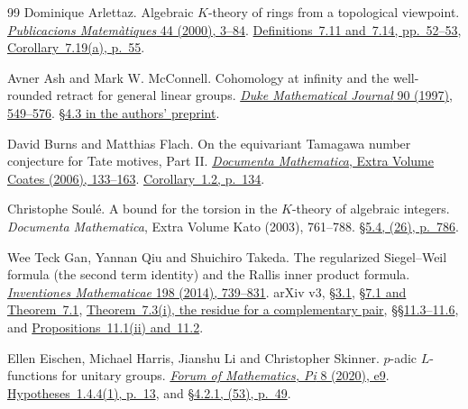 \begin{thebibliography}{99}
Dominique Arlettaz.
Algebraic \(K\)-theory of rings from a topological viewpoint.
\href{https://mat.uab.es/pubmat/fitxers/download/FileType:pdf/FolderName:v44(1)/FileName:44100_01.pdf}
{\emph{Publicacions Matemàtiques} 44 (2000), 3--84}.
\href{https://mat.uab.es/pubmat/fitxers/download/FileType:pdf/FolderName:v44(1)/FileName:44100_01.pdf\#page=50}
{Definitions~7.11 and~7.14, pp.~52--53},
\href{https://mat.uab.es/pubmat/fitxers/download/FileType:pdf/FolderName:v44(1)/FileName:44100_01.pdf\#page=53}
{Corollary~7.19(a), p.~55}.

Avner Ash and Mark W. McConnell.
Cohomology at infinity and the well-rounded retract for general
linear groups.
\href{https://doi.org/10.1215/S0012-7094-97-09015-3}
{\emph{Duke Mathematical Journal} 90 (1997), 549--576}.
\href{https://arxiv.org/pdf/math/9611220v1\#page=12}
{\S4.3 in the authors' preprint}.

David Burns and Matthias Flach.
On the equivariant Tamagawa number conjecture for Tate motives, Part II.
\href{https://doi.org/10.4171/DMS/4/4}
{\emph{Documenta Mathematica}, Extra Volume Coates (2006), 133--163}.
\href{https://ems.press/content/book-chapter-files/27466?nt=1\#page=2}
{Corollary~1.2, p.~134}.

Christophe Soul\'e.
A bound for the torsion in the \(K\)-theory of algebraic integers.
\emph{Documenta Mathematica}, Extra Volume Kato (2003), 761--788.
\href{https://ems.press/content/book-chapter-files/27335\#page=26}
{\S5.4, (26), p.~786}.

Wee Teck Gan, Yannan Qiu and Shuichiro Takeda.
The regularized Siegel--Weil formula (the second term identity) and the
Rallis inner product formula.
\href{https://doi.org/10.1007/s00222-014-0509-0}{\emph{Inventiones
Mathematicae} 198 (2014), 739--831}.
arXiv v3, \href{https://arxiv.org/pdf/1207.4709v3\#page=14}{\S3.1},
\href{https://arxiv.org/pdf/1207.4709v3\#page=33}{\S7.1 and Theorem~7.1},
\href{https://arxiv.org/pdf/1207.4709\#page=34}{Theorem~7.3(i), the residue for a complementary pair},
\href{https://arxiv.org/pdf/1207.4709v3\#page=52}{\S\S11.3--11.6}, and
\href{https://arxiv.org/pdf/1207.4709v3\#page=53}{Propositions~11.1(ii) and~11.2}.

Ellen Eischen, Michael Harris, Jianshu Li and Christopher Skinner.
\(p\)-adic \(L\)-functions for unitary groups.
\href{https://doi.org/10.1017/fmp.2020.4}
{\emph{Forum of Mathematics, Pi} 8 (2020), e9}.
\href{https://www.cambridge.org/core/services/aop-cambridge-core/content/view/E1D22AA60E10A5B5CA5F838EB48467D7/S2050508620000049a.pdf/p_adic_l_functions_for_unitary_groups.pdf\#page=13}
{Hypotheses~1.4.4(1), p.~13}, and
\href{https://www.cambridge.org/core/services/aop-cambridge-core/content/view/E1D22AA60E10A5B5CA5F838EB48467D7/S2050508620000049a.pdf/p_adic_l_functions_for_unitary_groups.pdf\#page=49}
{\S4.2.1, (53), p.~49}.


\end{thebibliography}
